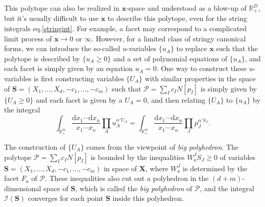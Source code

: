 \documentclass[hidelinks,12pt]{article}
\begin{document}
This polytope can also be realized in $\mathbf x$-space and understood
as a blow-up of $\mathbb R_+^D$, but it's usually difficult to use $\mathbf x$ to
describe this polytope, even for the string integrals eq.\eqref{stringint}. For
example, a facet may correspond to a complicated limit process of $\mathbf x\to 0$
or $\infty$.
However, for a limited class of stringy canonical forms, we can introduce
the so-called $u$-variables $\{u_A\}$ to replace $\mathbf x$ such that the polytope 
is described by $\{u_A\geq 0\}$ and a set of polynomial equations of $\{u_A\}$, and each
facet is simply given by an equation $u_A=0$. One way to construct these $u$-variables
is first constructing variables $\{U_A\}$ with similar properties in the space of
$\mathbf S=(X_1,\dots,X_d,-c_1,\dots,-c_m)$ such that $\mathcal P=\sum_I c_I N[p_I]$ 
is simply given by $\{U_A\geq 0\}$ and each facet is given by a $U_A=0$, and then
relating $\{U_A\}$ to $\{u_A\}$ by the integral
\[
	\int_{\mathbb R_+^m}\frac{\mathrm d x_1\cdots \mathrm d x_n}{x_1\cdots x_n}
	\prod_{A}u_A^{\alpha' U_A}
	=
	\int_{\mathbb R_+^m}\frac{\mathrm d x_1\cdots \mathrm d x_n}{x_1\cdots x_n}
	\prod_{J}p_J^{\alpha' S_J}.
\]

The construction of $\{U_A\}$ comes from the viewpoint of \textit{big polyhedron}.
The polytope $\mathcal P=\sum_I c_I N[p_I]$ is bounded by the inequalities
$W_a^JS_J\geq 0$ of variables $\mathbf S=(X_1,\dots,X_d,-c_1,\dots,-c_m)$ in space 
of $\mathbf X$, where $W_a^J$ is determined by the facet $F_a$ of $\mathcal P$. 
These inequalities also cut out a polyhedron in the $(d+m)$-dimensional space of 
$\mathbf S$, which is called the \textit{big polyhedron} of $\mathcal P$, 
and the integral $\mathcal I(\mathbf S)$ converges for each point $\mathbf S$ 
inside this polyhedron. 
\end{document}
